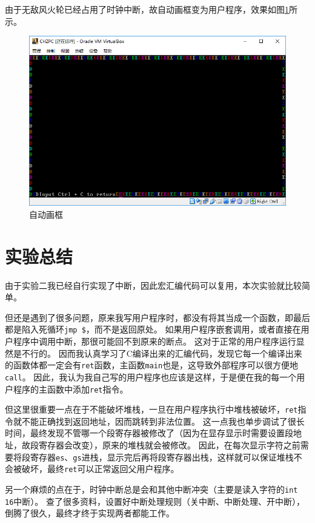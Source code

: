 \documentclass[logo,reportComp]{thesis}
\begin{document}
由于无敌风火轮已经占用了时钟中断，故自动画框变为用户程序，效果如图\ref{fig:box}所示。
\begin{figure}[H]
\centering
\includegraphics[width=0.8\linewidth]{fig/box.PNG}
\caption{自动画框}
\label{fig:box}
\end{figure}

\section{实验总结}

由于实验二我已经自行实现了中断，因此宏汇编代码可以复用，本次实验就比较简单。

但还是遇到了很多问题，原来我写用户程序时，都没有将其当成一个函数，即最后都是陷入死循环\verb'jmp $'，而不是返回原处。
如果用户程序嵌套调用，或者直接在用户程序中调用中断，那很可能回不到原来的断点。
这对于正常的用户程序运行显然是不行的。
因而我认真学习了C编译出来的汇编代码，发现它每一个编译出来的函数体都一定会有\verb'ret'函数，主函数\verb'main'也是，这导致外部程序可以很方便地\verb'call'。
因此，我认为我自己写的用户程序也应该是这样，于是便在我的每一个用户程序的主函数中添加\verb'ret'指令。

但这里很重要一点在于不能破坏堆栈，一旦在用户程序执行中堆栈被破坏，\verb'ret'指令就不能正确找到返回地址，因而跳转到非法位置。
这一点我也单步调试了很长时间，最终发现不管哪一个段寄存器被修改了（因为在显存显示时需要设置段地址，故段寄存器会改变），原来的堆栈就会被修改。
因此，在每次显示字符之前需要将段寄存器\verb'es'、\verb'gs'进栈，显示完后再将段寄存器出栈，这样就可以保证堆栈不会被破坏，最终\verb'ret'可以正常返回父用户程序。

另一个麻烦的点在于，时钟中断总是会和其他中断冲突（主要是读入字符的\verb'int 16'中断）。
查了很多资料，设置好中断处理规则（关中断、中断处理、开中断），倒腾了很久，最终才终于实现两者都能工作。
\end{document}
